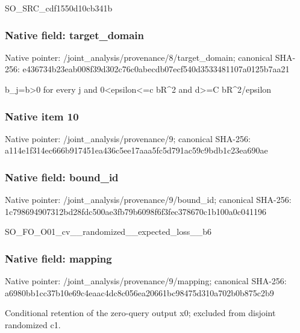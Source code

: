 \documentclass[10pt,a4paper]{article}
\begin{document}
\begingroup\raggedright\sloppy SO\_\allowbreak{}SRC\_\allowbreak{}cdf1550d10cb341b\par\endgroup

\subsubsection{Native field: target\_\allowbreak{}domain}
Native pointer: /joint\_\allowbreak{}analysis/provenance/8/target\_\allowbreak{}domain; canonical SHA-256: e436734b23eab008f39d302c76c0abecdb07ecf540d3533481107a0125b7aa21

\begingroup\raggedright\sloppy b\_\allowbreak{}j=\allowbreak{}b>0 for every j and 0<epsilon<=\allowbreak{}c bR\textasciicircum{}2 and d>=\allowbreak{}C bR\textasciicircum{}2/\allowbreak{}epsilon\par\endgroup

\subsubsection{Native item 10}
Native pointer: /joint\_\allowbreak{}analysis/provenance/9; canonical SHA-256: a114e1f314ec666b917451ea436c5ee17aaa5fc5d791ac59c9bdb1c23ea690ae

\subsubsection{Native field: bound\_\allowbreak{}id}
Native pointer: /joint\_\allowbreak{}analysis/provenance/9/bound\_\allowbreak{}id; canonical SHA-256: 1c798694907312bd28fdc500ae3fb79b6098f6f3fec378670c1b100a0c041196

\begingroup\raggedright\sloppy SO\_\allowbreak{}FO\_\allowbreak{}O01\_\allowbreak{}cv\_\allowbreak{}\_\allowbreak{}randomized\_\allowbreak{}\_\allowbreak{}expected\_\allowbreak{}loss\_\allowbreak{}\_\allowbreak{}b6\par\endgroup

\subsubsection{Native field: mapping}
Native pointer: /joint\_\allowbreak{}analysis/provenance/9/mapping; canonical SHA-256: a6980bb1cc37b10e69c4eaac4dc8c056ea20661bc98475d310a702b0b875c2b9

\begingroup\raggedright\sloppy Conditional retention of the zero-query output x0;\allowbreak{} excluded from disjoint randomized c1.\par\endgroup
\end{document}
